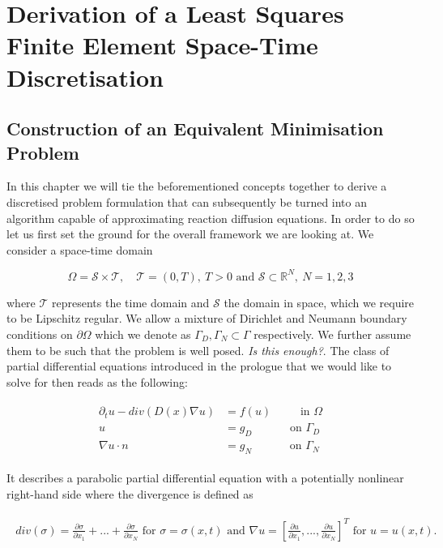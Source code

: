 \documentclass[../draft_1.tex]{subfiles}
\begin{document}
\chapter{Derivation of a  Least Squares Finite Element Space-Time Discretisation}
\section{Construction of an Equivalent Minimisation Problem}

In this chapter we will tie the beforementioned concepts together to derive a discretised problem formulation that can subsequently be turned into an algorithm capable of approximating reaction diffusion equations. In order to do so let us first set the ground for the overall framework we are looking at. We consider a space-time domain 
\begin{ceqn}
\begin{equation}
\Omega = \mathcal{S} \times \mathcal{T}, \quad \mathcal{T} = (0,T), \ T>0 \text{ and }  \mathcal{S} \subset \mathbb{R}^N, \ N = 1,2,3
\end{equation} 
\end{ceqn}
where $\mathcal{T} $ represents the time domain and $ \mathcal{S}$ the domain in space, which we require to be Lipschitz regular. We allow a mixture of Dirichlet and Neumann boundary conditions on $\partial \Omega$ which we denote as $\Gamma_D, \Gamma_N \subset \Gamma$ respectively. We further assume them to be such that the problem is well posed. \textit{Is this enough?}.  The class of partial differential equations introduced in the prologue that we would like to solve for then reads as the following:
\begin{ceqn}
\begin{align}
\begin{aligned}
\label{strong_form}
\partial_t u - div (D(x) \nabla u) &= f(u) \qquad \  \text{ in } \Omega \\
u &= g_D \quad \qquad \text{ on } \Gamma_D \\
\nabla u \cdot n &= g_N \quad \qquad \text{ on } \Gamma_N
\end{aligned}
\end{align}
\end{ceqn}
It describes a parabolic partial differential equation with a potentially nonlinear right-hand side where the divergence is defined as 
\begin{ceqn}
	\begin{align*}
\begin{aligned}
div(\sigma) = \frac{\partial \sigma}{\partial x_1} + ... + \frac{\partial \sigma}{\partial x_N} \text{  for } \sigma = \sigma(x,t) \text{ and } \nabla u = [\frac{\partial u}{\partial x_1}, ..., \frac{\partial u}{\partial x_N} ]^T \text{  for } u = u(x,t). 
\end{aligned}
\end{align*}
\end{ceqn}
\end{document}
